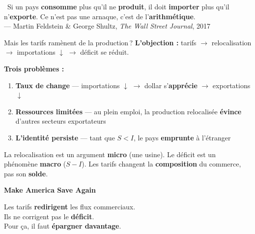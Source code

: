 \documentclass[aspectratio=169]{beamer}
\begin{document}
\begin{frame}{}
   \centering
   \vfill
   {\large \guillemotleft~Si un pays \textbf{consomme} plus qu'il ne \textbf{produit}, il doit \textbf{importer} plus qu'il n'\textbf{exporte}. Ce n'est pas une arnaque, c'est de l'\textbf{arithmétique}.~\guillemotright} \\
   \vspace{0.3cm}
   \mbox{}\hfill{\small\textcolor{HECgray}{--- Martin Feldstein \& George Shultz, \textit{The Wall Street Journal}, 2017}}
   \vfill
\end{frame}


\begin{frame}[t]{Mais les tarifs ramènent de la production\,?}
   \small
   \textbf{L'objection :} tarifs $\to$ relocalisation $\to$ importations $\downarrow$ $\to$ déficit se réduit.
   \vspace{0.3cm}

   \textbf{Trois \textcolor{HECcoral}{problèmes} :}
   \vspace{0.15cm}
   \begin{enumerate}
      \setlength\itemsep{0.25cm}
      \item \textbf{Taux de change} --- importations $\downarrow$ $\to$ dollar s'\textbf{apprécie} $\to$ exportations $\downarrow$
      \item \textbf{Ressources limitées} --- au plein emploi, la production relocalisée \textbf{évince} d'autres secteurs exportateurs
      \item \textbf{L'identité persiste} --- tant que $S < I$, le pays \textbf{emprunte} à l'étranger
   \end{enumerate}
   \vspace{0.1cm}
   \begin{keyinsight}
      La relocalisation est un argument \textbf{micro} (une usine). Le déficit est un phénomène \textbf{macro} ($S - I$). Les tarifs changent la \textbf{composition} du commerce, pas son \textbf{solde}.
   \end{keyinsight}
\end{frame}

\begin{frame}{}
   \centering
   \vfill
   {\LARGE\textbf{\textcolor{HECcoral}{M}\textcolor{HECnavy}{ake} \textcolor{HECcoral}{A}\textcolor{HECnavy}{merica} \textcolor{HECcoral}{S}\textcolor{HECnavy}{ave} \textcolor{HECcoral}{A}\textcolor{HECnavy}{gain}}}
   \vspace{0.6cm}

   {\large Les tarifs \textbf{redirigent} les flux commerciaux.}\\[8pt]
   {\large Ils ne corrigent pas le \textbf{déficit}.}\\[8pt]
   {\large Pour ça, il faut \textbf{épargner davantage}.}
   \vfill
\end{frame}
\end{document}
